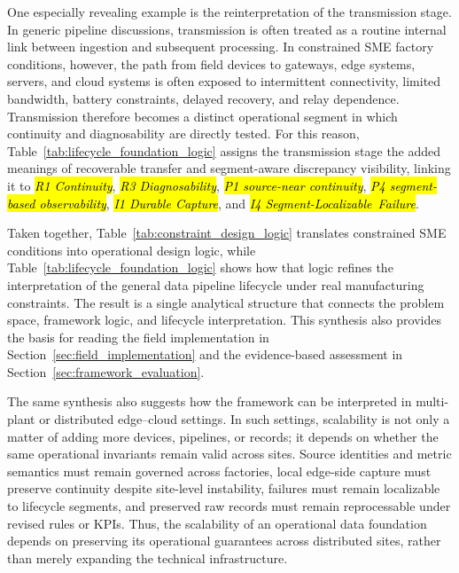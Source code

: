 \documentclass[systems,article,accept,pdftex,moreauthors]{Definitions/mdpi}
\begin{document}
One especially revealing example is the reinterpretation of the transmission stage. In generic pipeline discussions, transmission is often treated as a routine internal link between ingestion and subsequent processing. In constrained SME factory conditions, however, the path from field devices to gateways, edge systems, servers, and cloud systems is often exposed to intermittent connectivity, limited bandwidth, battery constraints, delayed recovery, and relay dependence. Transmission therefore becomes a distinct operational segment in which continuity and diagnosability are directly tested. For this reason, Table~\ref{tab:lifecycle_foundation_logic} assigns the transmission stage the added meanings of recoverable transfer and segment-aware discrepancy visibility, linking it to \emph{\hl{R1 Continuity}}, \emph{\hl{R3 Diagnosability}}, \emph{\hl{P1 source-near continuity}}, \emph{\hl{P4 segment-based observability}}, \emph{\hl{I1 Durable Capture}}, and \emph{\hl{I4 \mbox{Segment-Localizable Failure}}}.

Taken together, Table~\ref{tab:constraint_design_logic} translates constrained SME conditions into operational design logic, while Table~\ref{tab:lifecycle_foundation_logic} shows how that logic refines the interpretation of the general data pipeline lifecycle under real manufacturing constraints. The result is a single analytical structure that connects the problem space, framework logic, and lifecycle interpretation. This synthesis also provides the basis for reading the field implementation in Section~\ref{sec:field_implementation} and the evidence-based assessment in Section~\ref{sec:framework_evaluation}.

The same synthesis also suggests how the framework can be interpreted in multi-plant or distributed edge--cloud settings. In such settings, scalability is not only a matter of adding more devices, pipelines, or records; it depends on whether the same operational invariants remain valid across sites. Source identities and metric semantics must remain governed across factories, local edge-side capture must preserve continuity despite site-level instability, failures must remain localizable to lifecycle segments, and preserved raw records must remain reprocessable under revised rules or KPIs. Thus, the scalability of an operational data foundation depends on preserving its operational guarantees across distributed sites, rather than merely expanding the technical infrastructure.

\end{document}
